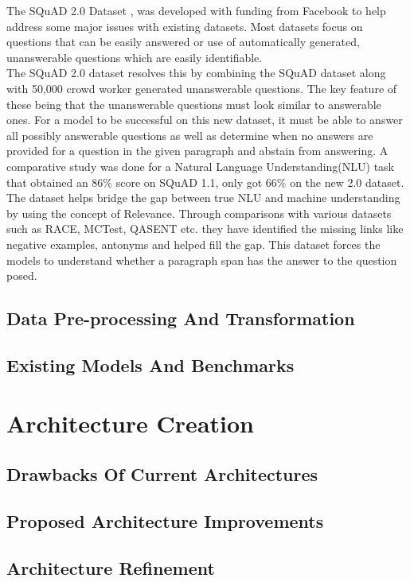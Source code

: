 \documentclass[12pt]{report}
\begin{document}
The SQuAD 2.0 Dataset \citep{dataset}, was developed with funding from Facebook to help address some major issues with existing datasets. Most datasets focus on questions that can be easily answered or use of automatically generated, unanswerable questions which are easily identifiable.\\
The SQuAD 2.0 dataset resolves this by combining the SQuAD dataset along with 50,000 crowd worker generated unanswerable questions. The key feature of these being that the unanswerable questions must look similar to answerable ones. For a model to be successful on this new dataset, it must be able to answer all possibly answerable questions as well as determine when no answers are provided for a question in the given paragraph and abstain from answering. A comparative study was done for a Natural Language Understanding(NLU) task that obtained an 86\% score on SQuAD 1.1, only got 66\% on the new 2.0 dataset.
The dataset helps bridge the gap between true NLU and machine understanding by using the concept of Relevance. Through comparisons with various datasets such as RACE, MCTest, QASENT etc. they have identified the missing links like negative examples, antonyms and helped fill the gap. This dataset forces the models to understand whether a paragraph span has the answer to the question posed.

    \section{Data Pre-processing And Transformation}\label{c32}
    \section{Existing Models And Benchmarks}\label{c33}
    \chapter{\centering Architecture Creation}\label{c4}
    \section{Drawbacks Of Current Architectures}\label{c41}
    \section{Proposed Architecture Improvements}\label{c42}
    \section{Architecture Refinement}\label{c43}
    \begin{appendices}
    \end{appendices}

\end{document}
